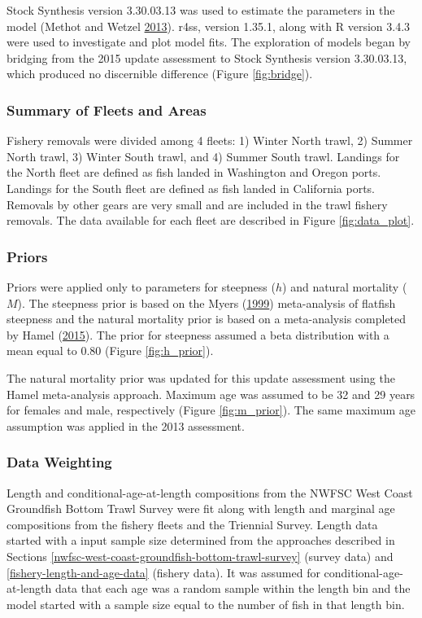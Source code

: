 \documentclass[12pt,]{article}
\begin{document}
Stock Synthesis version 3.30.03.13 was used to estimate the parameters
in the model (Methot and Wetzel
\protect\hyperlink{ref-methot_stock_2013}{2013}). r4ss, version 1.35.1,
along with R version 3.4.3 were used to investigate and plot model fits.
The exploration of models began by bridging from the 2015 update
assessment to Stock Synthesis version 3.30.03.13, which produced no
discernible difference (Figure \ref{fig:bridge}).

\subsubsection{Summary of Fleets and
Areas}\label{summary-of-fleets-and-areas}

Fishery removals were divided among 4 fleets: 1) Winter North trawl, 2)
Summer North trawl, 3) Winter South trawl, and 4) Summer South trawl.
Landings for the North fleet are defined as fish landed in Washington
and Oregon ports. Landings for the South fleet are defined as fish
landed in California ports. Removals by other gears are very small and
are included in the trawl fishery removals. The data available for each
fleet are described in Figure \ref{fig:data_plot}.

\subsubsection{Priors}\label{priors}

Priors were applied only to parameters for steepness (\(h\)) and natural
mortality (\(M\)). The steepness prior is based on the Myers
(\protect\hyperlink{ref-myers_maximum_1999}{1999}) meta-analysis of
flatfish steepness and the natural mortality prior is based on a
meta-analysis completed by Hamel
(\protect\hyperlink{ref-hamel_method_2015}{2015}). The prior for
steepness assumed a beta distribution with a mean equal to 0.80 (Figure
\ref{fig:h_prior}).

The natural mortality prior was updated for this update assessment using
the Hamel meta-analysis approach. Maximum age was assumed to be 32 and
29 years for females and male, respectively (Figure \ref{fig:m_prior}).
The same maximum age assumption was applied in the 2013 assessment.

\subsubsection{Data Weighting}\label{data-weighting}

Length and conditional-age-at-length compositions from the NWFSC West
Coast Groundfish Bottom Trawl Survey were fit along with length and
marginal age compositions from the fishery fleets and the Triennial
Survey. Length data started with a input sample size determined from the
approaches described in Sections
\ref{nwfsc-west-coast-groundfish-bottom-trawl-survey} (survey data) and
\ref{fishery-length-and-age-data} (fishery data). It was assumed for
conditional-age-at-length data that each age was a random sample within
the length bin and the model started with a sample size equal to the
number of fish in that length bin.
\end{document}
